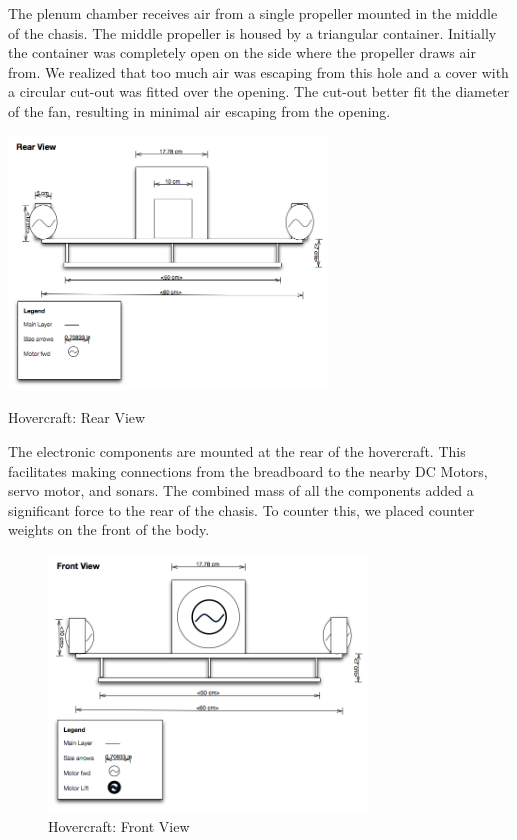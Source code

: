 The plenum chamber receives air from a single propeller mounted in the middle of the chasis. The middle propeller is housed by a triangular container. Initially the container was completely open on the side where the propeller draws air from. We realized that too much air was escaping from this hole and a cover with a circular cut-out was fitted over the opening. The cut-out better fit the diameter of the fan, resulting in minimal air escaping from the opening.


  \begin{center}
    \includegraphics[width=85mm]{imageSources/rearView.png}
  \end{center}
  \caption{Hovercraft: Rear View} 
  \label{rearView}


The electronic components are mounted at the rear of the hovercraft. This facilitates making connections from the breadboard to the nearby DC Motors, servo motor, and sonars. The combined mass of all the components added a significant force to the rear of the chasis. To counter this, we placed counter weights on the front of the body.

\begin{figure}[h]
  \begin{center}
    \includegraphics[width=85mm]{imageSources/frontView.png}
  \end{center}
  \caption{Hovercraft: Front View} 
  \label{frontView}
\end{figure}

